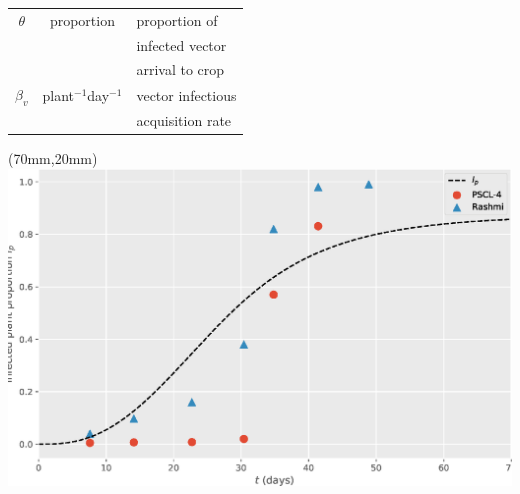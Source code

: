 \begin{frame}[plain]
{\begin{textblock*}{50mm}
\begin{tabular}{|c |c |l |}
					$\theta$ & proportion & proportion of
					\\
					 	&&infected vector
					\\
					 	&&arrival to crop  \\
					\hline
					$\beta_v$ & plant$^{-1}$day$^{-1}$ & vector infectious
					\\
						&&acquisition rate\\ 
					\hline
				\end{tabular}
			\end{textblock*}
		}
		{
			\begin{textblock*}{55mm}(70mm,20mm)
				\includegraphics[width=\linewidth]{Feathergraphics/Simulation_data.eps}
			\end{textblock*}
		}
	\end{frame}
